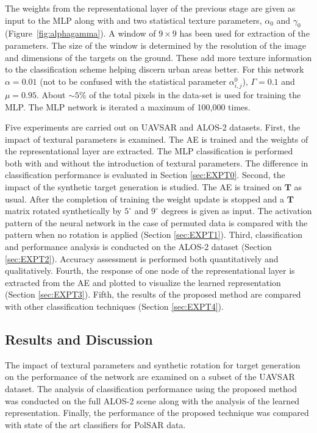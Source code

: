 The  weights from the representational layer of the previous stage are given as input to the MLP along with and two statistical texture parameters, $\alpha_0$ and $\gamma_0$ (Figure~\ref{fig:alphagamma}).
A window of $9\times9$ has been used for extraction of the parameters. The size of the window is determined by the resolution of the image and dimensions of the targets on the ground. These add more texture information to the classification scheme helping discern urban areas better.  For this network $\alpha=0.01$ (not to be confused with the statistical parameter $\alpha^0_{i,j}$), $\Gamma = 0.1$ and $\mu = 0.95$. About $\sim 5\%$ of the total pixels in the data-set is used for training the MLP. The MLP network is iterated a maximum of 100,000 times.


 



Five experiments are carried out on UAVSAR and ALOS-2 datasets. First, the impact of textural parameters is examined. The AE is trained and the weights of the representational layer are extracted. The MLP classification is performed both with and without the introduction of textural parameters. The difference in classification performance is evaluated in Section \ref{sec:EXPT0}. Second, the impact of the synthetic target generation is studied. The AE is trained on $\mathbf{T}$ as usual. After the completion of training the weight update is stopped and a $\mathbf{T}$ matrix rotated synthetically by $5^\circ$ and $9^\circ$ degrees is given as input. The activation pattern of the neural network in the case of permuted data is compared with the pattern when no rotation is applied (Section \ref{sec:EXPT1}).
Third, classification and performance analysis is conducted on the ALOS-2 dataset (Section \ref{sec:EXPT2}). Accuracy assessment is performed both quantitatively and qualitatively. Fourth, the response of one node of the representational layer is extracted from the AE and plotted to visualize the learned representation  (Section \ref{sec:EXPT3}). Fifth, the results of the proposed method are compared with other classification techniques (Section \ref{sec:EXPT4}).





\subsection{Results and Discussion}
\label{sec:results}


The impact of textural parameters and synthetic rotation for target generation on the performance of the network are examined on a subset of the UAVSAR dataset. The analysis of classification performance using the proposed method was conducted on the full ALOS-2 scene along with the analysis of the learned representation. Finally, the performance of the proposed technique was compared with state of the art classifiers for PolSAR data. 



